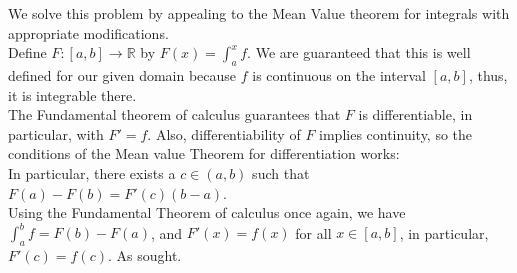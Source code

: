 \documentclass[11 pt]{article}
\begin{document}
\begin{solution}
	We solve this problem by appealing to the Mean Value theorem for integrals with appropriate modifications.\\
	Define $F:[a,b]\to\mathbb{R}$ by $F(x)=\int_{a}^{x}f$. We are guaranteed that this is well defined for our given domain because $f$ is continuous on the interval $[a,b]$, thus, it is integrable there.\\
	The Fundamental theorem of calculus guarantees that $F$ is differentiable, in particular, with $F'=f$. Also, differentiability of $F$ implies continuity, so the conditions of the Mean value Theorem for differentiation works:\\
	In particular, there exists a $c\in(a,b)$ such that $F(a)-F(b)=F'(c)(b-a)$.\\
	Using the Fundamental Theorem of calculus once again, we have $\int_{a}^{b}f=F(b)-F(a)$, and $F'(x)=f(x)$ for all $x\in[a,b]$, in particular,  $F'(c)=f(c)$. As sought.
\end{solution}
\end{document}
